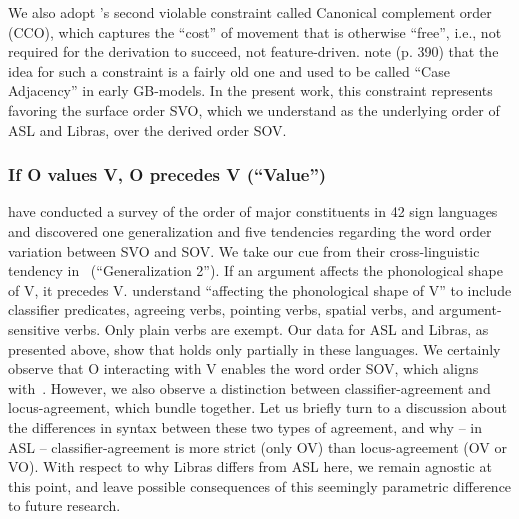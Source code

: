 \documentclass[output=paper]{langscibook}
\begin{document}
We also adopt \citeauthor{Bobaljik.Wurmbrand.2012}'s second violable constraint called Canonical
complement order (CCO), which captures the “cost” of movement that
is otherwise “free”, i.e., not required for the derivation to succeed, not
feature-driven. \citeauthor{Bobaljik.Wurmbrand.2012} note (p. 390) that the idea for such a constraint is
a fairly old one and used to be called “Case Adjacency” in early
GB-models.
In the present work, this constraint represents favoring the surface
order SVO, which we understand as the underlying order of ASL and
Libras, over the derived order SOV.

\subsubsection{If O values V, O precedes V (``Value'')}

\citet{Napoli.SS.2014} have conducted a survey of the order
of major constituents in 42 sign languages and discovered one
generalization and five tendencies regarding the word order variation
between SVO and SOV. We take our cue from their cross-linguistic
tendency in~ (“Generalization 2”).
\ea 
    \label{lasz:ex:11}
    If an argument affects the phonological shape of V, it precedes V. 
    \citep{Napoli.SS.2014}
\z 
\citeauthor{Napoli.SS.2014} understand “affecting the phonological shape
of V” to include classifier predicates, agreeing verbs, pointing verbs,
spatial verbs, and argument-sensitive verbs. Only plain verbs are
exempt. Our data for ASL and Libras, as presented above, show that
 holds only partially in these languages. We certainly observe that
O interacting with V enables the word order SOV, which aligns with~. 
However, we also observe a distinction between
classifier-agreement and locus-agreement, which \citeauthor{Napoli.SS.2014} 
bundle together. Let us briefly turn to a discussion
about the differences in syntax between these two types of agreement,
and why -- in ASL -- classifier-agreement is more strict (only OV)
than locus-agreement (OV or VO). With respect to why Libras differs
from ASL here, we remain agnostic at this point, and leave possible
consequences of this seemingly parametric difference to future
research.
\end{document}
